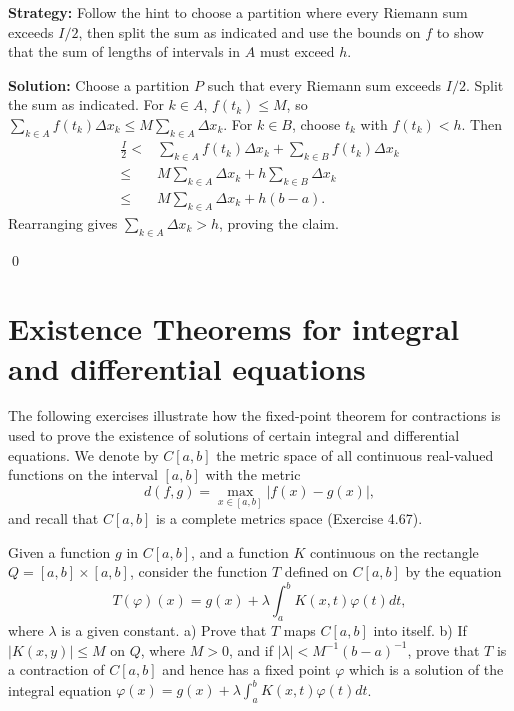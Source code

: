 \noindent\textbf{Strategy:} Follow the hint to choose a partition where every Riemann sum exceeds $I/2$, then split the sum as indicated and use the bounds on $f$ to show that the sum of lengths of intervals in $A$ must exceed $h$.

\bigskip\noindent\textbf{Solution:}
Choose a partition $P$ such that every Riemann sum exceeds $I/2$. Split the sum as indicated. For $k\in A$, $f(t_k)\le M$, so $\sum_{k\in A} f(t_k)\Delta x_k\le M\sum_{k\in A}\Delta x_k$. For $k\in B$, choose $t_k$ with $f(t_k)<h$. Then
\begin{align*}
\frac{I}{2}<&\sum_{k\in A} f(t_k)\Delta x_k+\sum_{k\in B} f(t_k)\Delta x_k\\
\le & M\sum_{k\in A}\Delta x_k + h\sum_{k\in B}\Delta x_k\\
\le & M\sum_{k\in A}\Delta x_k + h(b-a).
\end{align*}
Rearranging gives $\sum_{k\in A}\Delta x_k>h$, proving the claim.


\qed
\section{Existence Theorems for integral and differential equations}
The following exercises illustrate how the fixed-point theorem for contractions is used to prove the existence of solutions of certain integral and differential equations. We denote by $C[a, b]$ the metric space of all continuous real-valued functions on the interval $[a, b]$ with the metric $$d(f, g) = \max_{x \in [a, b]} |f(x) - g(x)|,$$ 
and recall that $C[a,b]$ is a complete metrics space (Exercise 4.67).




\begin{problembox}
\begin{problemstatement}
Given a function $g$ in $C[a, b]$, and a function $K$ continuous on the rectangle $Q = [a, b] \times [a, b]$, consider the function $T$ defined on $C[a, b]$ by the equation 
\[T(\varphi)(x) = g(x) + \lambda \int_a^b K(x, t)\varphi(t) dt,\]
where $\lambda$ is a given constant.
a) Prove that $T$ maps $C[a, b]$ into itself.
b) If $|K(x, y)| \leq M$ on $Q$, where $M > 0$, and if $|\lambda| < M^{-1}(b - a)^{-1}$, prove that $T$ is a contraction of $C[a, b]$ and hence has a fixed point $\varphi$ which is a solution of the integral equation $\varphi(x) = g(x) + \lambda \int_a^b K(x, t)\varphi(t) dt$.
\end{problemstatement}
\end{problembox}

